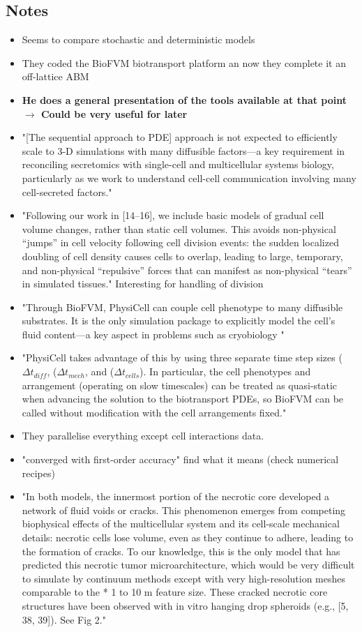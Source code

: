 \documentclass[11pt,a4paper]{article}
\begin{document}
\subsection*{Notes}
\begin{itemize}
\item Seems to compare stochastic and deterministic models
\item They coded the BioFVM biotransport platform  an now they complete it an off-lattice ABM
\item \textbf{He does a general presentation of the tools available at that point $\rightarrow$ Could be very useful for later}
\item  "[The sequential approach to PDE] approach is not expected to efficiently scale to 3-D simulations with many diffusible factors—a key requirement in reconciling secretomics with single-cell and multicellular systems biology, particularly as we work to understand cell-cell communication involving many cell-secreted factors."
\item "Following our work in [14–16], we include basic models of gradual cell volume changes, rather than static cell volumes. This avoids non-physical “jumps” in cell velocity following cell division events: the sudden localized doubling of cell density causes cells to overlap, leading to large, temporary, and non-physical “repulsive” forces that can manifest as non-physical “tears” in simulated tissues." Interesting for handling of division
\item "Through BioFVM, PhysiCell can couple cell phenotype to many diffusible substrates. It is the only simulation package to explicitly model the cell’s fluid content—a key aspect in problems such as cryobiology "
\item "PhysiCell takes advantage of this by using three separate time step sizes ($\Delta t_{diff}$, ($\Delta t_{mech}$, and ($\Delta t_{cells}$). In particular, the cell phenotypes and arrangement (operating on slow timescales) can be treated as quasi-static when advancing the solution to the biotransport PDEs, so BioFVM can be called without modification with the cell arrangements fixed."
\item They parallelise everything except cell interactions data.
\item "converged with first-order accuracy" find what it means (check numerical recipes)
\item "In both models, the innermost portion of the necrotic core developed a network of fluid voids or cracks. This phenomenon emerges from competing biophysical effects of the multicellular system and its cell-scale mechanical details: necrotic cells lose volume, even as they continue to adhere, leading to the formation of cracks. To our knowledge, this is the only model that has predicted this necrotic tumor microarchitecture, which would be very difficult to simulate by continuum methods except with very high-resolution meshes comparable to the * 1 to 10 \textmu m feature size. These cracked necrotic core structures have been observed with in vitro hanging drop spheroids (e.g., [5, 38, 39]). See Fig 2."

\end{itemize}
\end{document}
